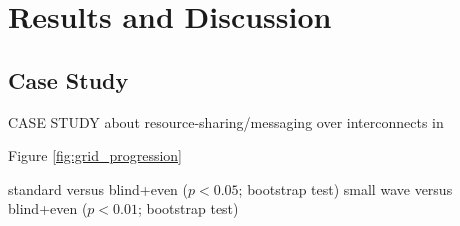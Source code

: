 \section{Results and Discussion} \label{sec:results}









% 

\subsection{Case Study} \label{sec:casestudy}

CASE STUDY about resource-sharing/messaging over interconnects in


Figure \ref{fig:grid_progression}

standard versus blind+even ($p < 0.05$; bootstrap test)
small wave versus blind+even ($p < 0.01$; bootstrap test)
